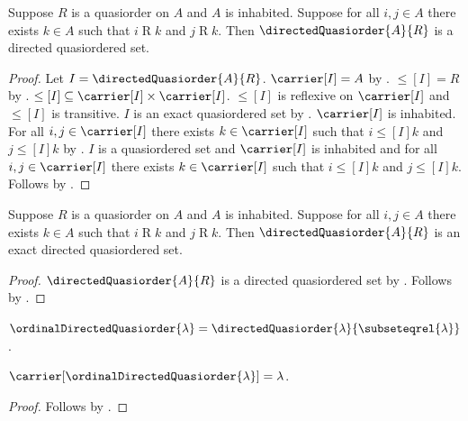 \begin{theorem}\label{directed_quasiorder_is_directed}
    Suppose $R$ is a quasiorder on $A$ and $A$ is inhabited.
    Suppose for all $i,j\in A$ there exists $k\in A$ such that
        $i\mathrel{R}k$ and $j\mathrel{R}k$.
    Then $\directedQuasiorder{A}{R}$ is a directed quasiordered set.
\end{theorem}
\begin{proof}
    Let $I=\directedQuasiorder{A}{R}$.
    $\carrier[I]=A$ by .
    $\leq[I]=R$ by .
    $\leq[I]\subseteq\carrier[I]\times\carrier[I]$.
    $\leq[I]$ is reflexive on $\carrier[I]$ and
        $\leq[I]$ is transitive.
    $I$ is an exact quasiordered set by
        .
    $\carrier[I]$ is inhabited.
    For all $i,j\in\carrier[I]$ there exists $k\in\carrier[I]$
        such that $i\mathrel{\leq[I]}k$ and
            $j\mathrel{\leq[I]}k$ by \auto.
    $I$ is a quasiordered set and $\carrier[I]$ is inhabited and
        for all $i,j\in\carrier[I]$ there exists $k\in\carrier[I]$
        such that $i\mathrel{\leq[I]}k$ and
            $j\mathrel{\leq[I]}k$.
    Follows by .
\end{proof}

\begin{theorem}\label{directed_quasiorder_is_exact}
    Suppose $R$ is a quasiorder on $A$ and $A$ is inhabited.
    Suppose for all $i,j\in A$ there exists $k\in A$ such that
        $i\mathrel{R}k$ and $j\mathrel{R}k$.
    Then $\directedQuasiorder{A}{R}$ is an exact
        directed quasiordered set.
\end{theorem}
\begin{proof}
    $\directedQuasiorder{A}{R}$ is a directed quasiordered set by
        .
    Follows by
        .
\end{proof}

\begin{definition}\label{ordinal_directed_quasiorder}
    $\ordinalDirectedQuasiorder{\lambda}=
        \directedQuasiorder{\lambda}{\subseteqrel{\lambda}}$.
\end{definition}

\begin{proposition}\label{ordinal_directed_quasiorder_carrier}
    $\carrier[\ordinalDirectedQuasiorder{\lambda}]=\lambda$.
\end{proposition}
\begin{proof}
    Follows by
        .
\end{proof}

